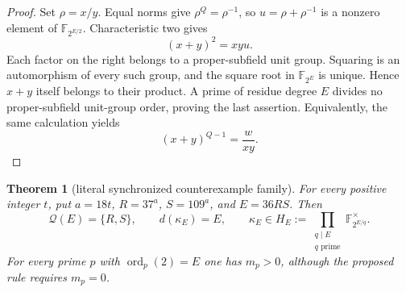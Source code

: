 \documentclass[11pt]{article}
\newtheorem{theorem}{Theorem}[section]
\theoremstyle{definition}
\theoremstyle{remark}
\begin{document}
\begin{proof}
Set $\rho=x/y$.  Equal norms give $\rho^Q=\rho^{-1}$, so
$u=\rho+\rho^{-1}$ is a nonzero element of $\mathbb F_{2^{E/2}}$.
Characteristic two gives
\[
 (x+y)^2=xyu.
\]
Each factor on the right belongs to a proper-subfield unit group.  Squaring
is an automorphism of every such group, and the square root in
$\mathbb F_{2^E}$ is unique.  Hence $x+y$ itself belongs to their product.
A prime of residue degree $E$ divides no proper-subfield unit-group order,
proving the last assertion.  Equivalently, the same calculation yields
\[
 (x+y)^{Q-1}=\frac{w}{xy}.
\]
\end{proof}

\begin{theorem}[literal synchronized counterexample family]
\label{thm:equal-norm-counterexample}
For every positive integer $t$, put $a=18t$, $R=37^a$, $S=109^a$, and $E=36RS$.  Then
\[
 \mathcal Q(E)=\{R,S\},\qquad d(\kappa_E)=E,\qquad
 \kappa_E\in
 H_E:=\prod_{\substack{q\mid E\\q\text{ prime}}}
              \mathbb F_{2^{E/q}}^\times.
\]
For every prime $p$ with $\operatorname{ord}_p(2)=E$ one has $m_p>0$,
although the proposed rule requires $m_p=0$.
\end{theorem}
\end{document}

